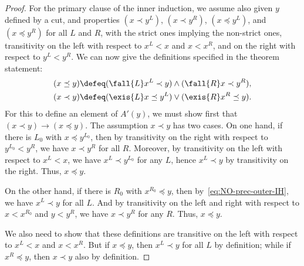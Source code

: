 \begin{proof}
  For the primary clause of the inner induction, we assume also given $y$ defined by a cut, and properties $(x\prec y^L)$, $(x\prec y^R)$, $(x\preceq y^L)$, and $(x\preceq y^R)$ for all $L$ and $R$, with the strict ones implying the non-strict ones, transitivity on the left with respect to $x^L<x$ and $x<x^R$, and on the right with respect to $y^L<y^R$.
  We can now give the definitions specified in the theorem statement:
  \begin{align}
    (x\preceq y) &\defeq
    (\fall{L} x^L\prec y) \land (\fall{R} x\prec y^R), \label{eq:NO-preceq-def}\\
    (x\prec y) &\defeq
    (\exis{L} x\preceq y^L) \lor (\exis{R} x^R \preceq y).\label{eq:NO-prec-def}
  \end{align}
  For this to define an element of $A'(y)$, we must show first that $(x\prec y) \to (x\preceq y)$.
  The assumption $x\prec y$ has two cases.
  On one hand, if there is $L_0$ with $x\preceq y^{L_0}$, then by transitivity on the right with respect to $y^{L_0}<y^R$, we have $x\prec y^R$ for all $R$.
  Moreover, by transitivity on the left with respect to $x^L<x$, we have $x^L \prec y^{L_0}$ for any $L$, hence $x^L\prec y$ by transitivity on the right.
  Thus, $x\preceq y$.

  On the other hand, if there is $R_0$ with $x^{R_0}\preceq y$, then by~\eqref{eq:NO-prec-outer-IH}, we have $x^L \prec y$ for all $L$.
  And by transitivity on the left and right with respect to $x<x^{R_0}$ and $y<y^R$, we have $x\prec y^R$ for any $R$.
  Thus, $x\preceq y$.

  We also need to show that these definitions are transitive on the left with respect to $x^L<x$ and $x<x^R$.
  But if $x\preceq y$, then $x^L\prec y$ for all $L$ by definition; while if $x^R\preceq y$, then $x\prec y$ also by definition.


\end{proof}
